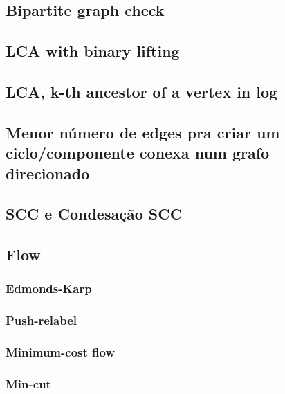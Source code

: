 \subsection{Bipartite graph check}


\subsection{LCA with binary lifting}


\subsection{LCA, k-th ancestor of a vertex in log}


\subsection{Menor número de edges pra criar um ciclo/componente conexa num grafo direcionado}


\subsection{SCC e Condesação SCC}


\subsection{Flow}

\subsubsection{Edmonds-Karp}


\subsubsection{Push-relabel}


\subsubsection{Minimum-cost flow}


\subsubsection{Min-cut}

